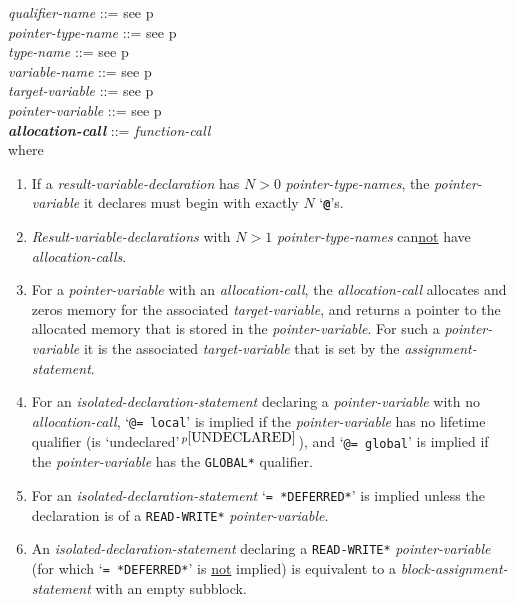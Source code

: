 \documentclass[12pt]{article}
\newcommand{\TT}[1]{{\tt \bfseries #1}}
\newcommand{\emkey}[1]{{\em \bfseries #1}}
\newcommand{\pagref}[1]{p\pageref{#1}}
\newcommand{\pagnote}[1]{$\,^{p\pageref{#1}}$}
\newenvironment{indpar}[1][0.3in]%
	{\begin{list}{}%
		     {\setlength{\itemsep}{0in}%
		      \setlength{\topsep}{0in}%
		      \setlength{\parsep}{1ex}%
		      \setlength{\labelwidth}{#1}%
		      \setlength{\leftmargin}{#1}%
		      \addtolength{\leftmargin}{\labelsep}}%
	 \item}%
	{\end{list}}
\begin{document}
\begin{indpar}
{\em qualifier-name} ::= see \pagref{QUALIFIER-NAME}
\\[0.5ex]
{\em pointer-type-name} ::= see \pagref{POINTER-TYPE-NAME}
\\[0.5ex]
{\em type-name} ::= see \pagref{TYPE-NAME}
\\[0.5ex]
{\em variable-name} ::= see \pagref{VARIABLE-NAME}
\\[0.5ex]
{\em target-variable} ::= see \pagref{TARGET-VARIABLE}
\\[0.5ex]
{\em pointer-variable} ::= see \pagref{POINTER-VARIABLE}
\\[0.5ex]
\emkey{allocation-call}\label{ALLOCATION-CALL} ::= {\em function-call}
\\[2ex]
where
\begin{enumerate}
\item If a {\em result-variable-declaration}
has $N>0$ {\em pointer-type-names}, the {\em pointer-variable}
it declares must begin with exactly $N$ `\TT{@}'s.
\item {\em Result-variable-declarations}
with $N>1$ {\em pointer-type-names} can\underline{not} have
{\em alloca\-tion-calls}.
\item For a {\em pointer-variable} with an {\em allocation-call},
the {\em allocation-call} allocates and zeros memory for the
associated {\em target-variable}, and returns a pointer to the
allocated memory that is stored in the {\em pointer-variable}.
For such a {\em pointer-variable} it is the
associated {\em target-variable} that is set by the {\em assignment-statement}.
\item For an {\em isolated-declaration-statement} declaring a
{\em pointer-variable} with no {\em alloca\-tion-call},
`{\tt @= local}' is implied if the {\em pointer-variable}
has no lifetime qualifier (is `undeclared'\pagnote{UNDECLARED}), and
`{\tt @= global}' is implied if the {\em pointer-variable}
has the {\tt *GLOBAL*} qualifier.
\item For an {\em isolated-declaration-statement} `{\tt = *DEFERRED*}'
is implied unless the declaration is of a {\tt *READ-WRITE*}
{\em pointer-variable}.
\item An {\em isolated-declaration-statement} declaring a
{\tt *READ-WRITE*} {\em pointer-variable} (for which
`{\tt = *DEFERRED*}' is \underline{not} implied) is equivalent
to a {\em block-assignment-statement} with an empty subblock.
\end{enumerate}

\end{indpar}
\end{document}
